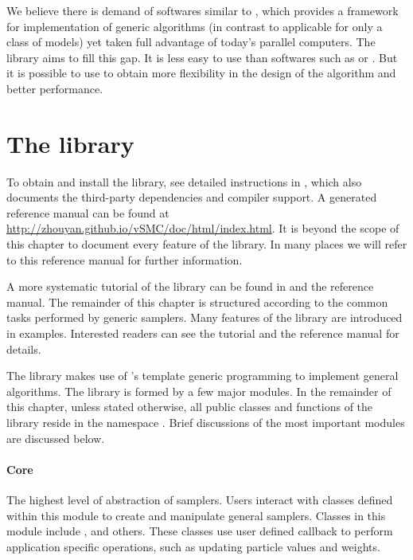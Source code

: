 We believe there is demand of softwares similar to \smctc, which provides a framework for implementation of generic \smc algorithms (in contrast to applicable for only a class of models) yet taken full advantage of today's parallel computers. The \vsmc library aims to fill this gap. It is less easy to use than softwares such as \libbi or \biips. But it is possible to use to obtain more flexibility in the design of the algorithm and better performance.

\section{The \protect\vsmc library}
\label{sec:The vSMC library}

To obtain and install the library, see detailed instructions in \cite{vsmcjss}, which also documents the third-party dependencies and compiler support. A \doxygen \cite{doxygen} generated reference manual can be found at \url{http://zhouyan.github.io/vSMC/doc/html/index.html}. It is beyond the scope of this chapter to document every feature of the \vsmc library. In many places we will refer to this reference manual for further information.

A more systematic tutorial of the library can be found in \cite{vsmcjss} and the reference manual. The remainder of this chapter is structured according to the common tasks performed by generic \smc samplers. Many features of the library are introduced in examples. Interested readers can see the tutorial \cite{vsmcjss} and the reference manual for details.

The \vsmc library makes use of \cpp's template generic programming to implement general \smc algorithms. The library is formed by a few major modules. In the remainder of this chapter, unless stated otherwise, all public classes and functions of the library reside in the namespace . Brief discussions of the most important modules are discussed below.

\paragraph{Core}

The highest level of abstraction of \smc samplers. Users interact with classes defined within this module to create and manipulate general \smc samplers. Classes in this module include ,  and others. These classes use user defined callback to perform application specific operations, such as updating particle values and weights.

